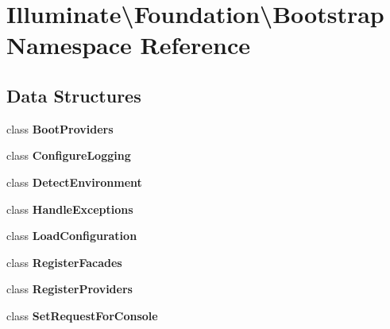 \section{Illuminate\textbackslash{}Foundation\textbackslash{}Bootstrap Namespace Reference}
\label{namespace_illuminate_1_1_foundation_1_1_bootstrap}
\subsection*{Data Structures}
\begin{DoxyCompactItemize}
\item 
class {\bf Boot\+Providers}
\item 
class {\bf Configure\+Logging}
\item 
class {\bf Detect\+Environment}
\item 
class {\bf Handle\+Exceptions}
\item 
class {\bf Load\+Configuration}
\item 
class {\bf Register\+Facades}
\item 
class {\bf Register\+Providers}
\item 
class {\bf Set\+Request\+For\+Console}
\end{DoxyCompactItemize}
